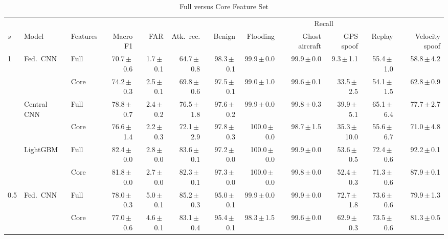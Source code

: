 \begin{table}[t]
\centering
\scriptsize
\caption{Full versus Core Feature Set}
\label{tab:ablation}
\setlength{\tabcolsep}{2pt}
\begin{tabular}{lllrrrrrrrrr}
\toprule
& & & & & & \multicolumn{6}{c}{Recall} \\ \cmidrule(lr){7-12}
$s$ & Model & Features & Macro F1 & FAR & Atk.\ rec. & Benign & Flooding & Ghost aircraft & GPS spoof & Replay & Velocity spoof \\
\midrule
1 & Fed.\ CNN & Full & 70.7{\,}$\pm${\,}0.6 & 1.7{\,}$\pm${\,}0.1 & 64.7{\,}$\pm${\,}0.8 & 98.3{\,}$\pm${\,}0.1 & 99.9{\,}$\pm${\,}0.0 & 99.9{\,}$\pm${\,}0.0 & 9.3{\,}$\pm${\,}1.1 & 55.4{\,}$\pm${\,}1.0 & 58.8{\,}$\pm${\,}4.2 \\
 &  & Core & 74.2{\,}$\pm${\,}0.3 & 2.5{\,}$\pm${\,}0.1 & 69.8{\,}$\pm${\,}0.6 & 97.5{\,}$\pm${\,}0.1 & 99.0{\,}$\pm${\,}1.0 & 99.6{\,}$\pm${\,}0.1 & 33.5{\,}$\pm${\,}2.5 & 54.1{\,}$\pm${\,}1.5 & 62.8{\,}$\pm${\,}0.9 \\
 & Central CNN & Full & 78.8{\,}$\pm${\,}0.7 & 2.4{\,}$\pm${\,}0.2 & 76.5{\,}$\pm${\,}1.8 & 97.6{\,}$\pm${\,}0.2 & 99.9{\,}$\pm${\,}0.0 & 99.8{\,}$\pm${\,}0.3 & 39.9{\,}$\pm${\,}5.1 & 65.1{\,}$\pm${\,}6.4 & 77.7{\,}$\pm${\,}2.7 \\
 &  & Core & 76.6{\,}$\pm${\,}1.4 & 2.2{\,}$\pm${\,}0.3 & 72.1{\,}$\pm${\,}2.9 & 97.8{\,}$\pm${\,}0.3 & 100.0{\,}$\pm${\,}0.0 & 98.7{\,}$\pm${\,}1.5 & 35.3{\,}$\pm${\,}10.0 & 55.6{\,}$\pm${\,}6.7 & 71.0{\,}$\pm${\,}4.8 \\
 & LightGBM & Full & 82.4{\,}$\pm${\,}0.0 & 2.8{\,}$\pm${\,}0.0 & 83.6{\,}$\pm${\,}0.1 & 97.2{\,}$\pm${\,}0.0 & 100.0{\,}$\pm${\,}0.0 & 99.9{\,}$\pm${\,}0.0 & 53.6{\,}$\pm${\,}0.5 & 72.4{\,}$\pm${\,}0.6 & 92.2{\,}$\pm${\,}0.1 \\
 &  & Core & 81.8{\,}$\pm${\,}0.0 & 2.7{\,}$\pm${\,}0.0 & 82.3{\,}$\pm${\,}0.1 & 97.3{\,}$\pm${\,}0.0 & 100.0{\,}$\pm${\,}0.0 & 99.8{\,}$\pm${\,}0.0 & 52.4{\,}$\pm${\,}0.3 & 71.3{\,}$\pm${\,}0.6 & 87.9{\,}$\pm${\,}0.1 \\
\midrule
0.5 & Fed.\ CNN & Full & 78.0{\,}$\pm${\,}0.3 & 5.0{\,}$\pm${\,}0.1 & 85.2{\,}$\pm${\,}0.3 & 95.0{\,}$\pm${\,}0.1 & 99.9{\,}$\pm${\,}0.0 & 99.9{\,}$\pm${\,}0.0 & 72.7{\,}$\pm${\,}1.8 & 73.6{\,}$\pm${\,}0.6 & 79.9{\,}$\pm${\,}1.3 \\
 &  & Core & 77.0{\,}$\pm${\,}0.6 & 4.6{\,}$\pm${\,}0.1 & 83.1{\,}$\pm${\,}0.4 & 95.4{\,}$\pm${\,}0.1 & 98.3{\,}$\pm${\,}1.5 & 99.6{\,}$\pm${\,}0.0 & 62.9{\,}$\pm${\,}0.3 & 73.5{\,}$\pm${\,}0.6 & 81.3{\,}$\pm${\,}0.5 \\

\end{tabular}
\end{table}
